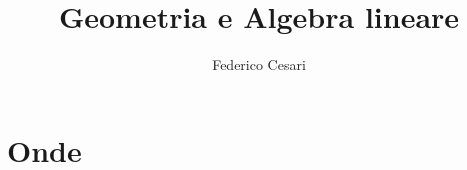 \documentclass[x11names]{report}
\title{Geometria e Algebra lineare}
\author{Federico Cesari}
\date{}
\begin{document}
	
	
	\tableofcontents
	\newpage
	
	\chapter{Onde}
%	
%	
%	
%	
%	
%	
\end{document}
